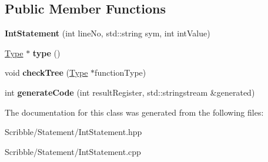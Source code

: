 \subsection*{Public Member Functions}
\begin{DoxyCompactItemize}
\item 
\hypertarget{class_int_statement_a8cb70b8340cba19b3bb320e4485d7c2f}{{\bfseries Int\-Statement} (int line\-No, std\-::string sym, int int\-Value)}\label{class_int_statement_a8cb70b8340cba19b3bb320e4485d7c2f}

\item 
\hypertarget{class_int_statement_ae10c87c0162000e4e202e046dcc4de58}{\hyperlink{class_type}{Type} $\ast$ {\bfseries type} ()}\label{class_int_statement_ae10c87c0162000e4e202e046dcc4de58}

\item 
\hypertarget{class_int_statement_aa770e8304ab1b599e67516faa887f2f4}{void {\bfseries check\-Tree} (\hyperlink{class_type}{Type} $\ast$function\-Type)}\label{class_int_statement_aa770e8304ab1b599e67516faa887f2f4}

\item 
\hypertarget{class_int_statement_af9aa2c4cc9f5915268f612a322d0d9cd}{int {\bfseries generate\-Code} (int result\-Register, std\-::stringstream \&generated)}\label{class_int_statement_af9aa2c4cc9f5915268f612a322d0d9cd}

\end{DoxyCompactItemize}


The documentation for this class was generated from the following files\-:\begin{DoxyCompactItemize}
\item 
Scribble/\-Statement/Int\-Statement.\-hpp\item 
Scribble/\-Statement/Int\-Statement.\-cpp\end{DoxyCompactItemize}
